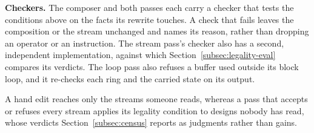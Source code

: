 \textbf{Checkers.}
\label{subsec:checkers}
The composer and both passes each carry a checker that tests the conditions above on the facts its rewrite touches.
A check that fails leaves the composition or the stream unchanged and names its reason, rather than dropping an operator or an instruction.
The stream pass's checker also has a second, independent implementation, against which Section~\ref{subsec:legality-eval} compares its verdicts.
The loop pass also refuses a buffer used outside its block loop, and it re-checks each ring and the carried state on its output.

A hand edit reaches only the streams someone reads, whereas a pass that accepts or refuses every stream applies its legality condition to designs nobody has read, whose verdicts Section~\ref{subsec:census} reports as judgments rather than gains.

